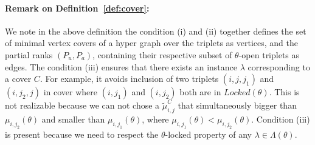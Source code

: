 \documentclass{article}
\newtheorem{lemma}[theorem]{Lemma}
\begin{document}
\paragraph{Remark on Definition~\ref{def:cover}:} We note in the above definition the condition (i) and (ii) together defines the set of minimal vertex covers of a hyper graph over the triplets as vertices, and the partial ranks $(P_u, P_a)$,  containing their respective subset of $\theta$-open triplets as edges. The condition (iii) ensures that there exists an instance $\lambda$ corresponding to a cover $C$. For example, it avoids inclusion of two triplets $(i,j,j_1)$ and $(i,j_2, j)$ in cover where  $(i,j_1)$ and $(i,j_2)$ both are in $Locked(\theta)$. This is not realizable because we can not chose a $\tilde{\mu}^C_{i,j}$ that simultaneously bigger than $\mu_{i,j_2}(\theta)$ and smaller than $\mu_{i,j_1}(\theta)$, where $\mu_{i,j_1}(\theta) < \mu_{i,j_2}(\theta)$. Condition (iii) is present because we need to respect the $\theta$-locked property of any $\lambda \in \Lambda(\theta)$.










\end{document}
